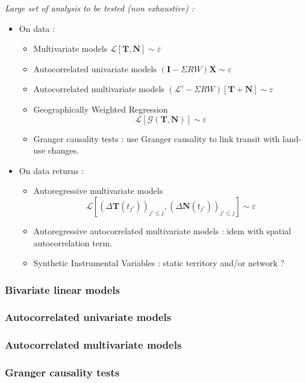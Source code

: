 \textit{Large set of analysis to be tested (non exhaustive) :}
\begin{itemize}
\item On data :
\begin{itemize}
\item Multivariate models $\mathcal{L}\left[\mathbf{T},\mathbf{N}\right]\sim \varepsilon$
\item Autocorrelated univariate models $(\mathbf{I} - \Sigma R W) \mathbf{X} \sim \varepsilon$
\item Autocorrelated multivariate models $(\mathcal{L}' - \Sigma R W)\left[\mathbf{T}+\mathbf{N}\right] \sim \varepsilon$
\item Geographically Weighted Regression~\cite{brunsdon1998geographically}
\[
\mathcal{L}\left[\mathcal{G}\left(\mathbf{T},\mathbf{N}\right)\right] \sim \varepsilon
\]
\item Granger causality tests : \cite{xie2009streetcars} use Granger causality to link transit with land-use changes.
\end{itemize}
\item On data returns :
\begin{itemize}
\item Autoregressive multivariate models
\[\mathcal{L}\left[(\Delta \mathbf{T}(t_{j'}))_{j'\leq j},(\Delta \mathbf{N}(t_{j'}))_{j'\leq j}\right] \sim \varepsilon\]
\item Autoregressive autocorrelated multivariate models : idem with spatial autocorrelation term.
\item Synthetic Instrumental Variables : static territory and/or network ?
\end{itemize}
\end{itemize}



\subsubsection{Bivariate linear models}

\subsubsection{Autocorrelated univariate models}

\subsubsection{Autocorrelated multivariate models}

\subsubsection{Granger causality tests}

